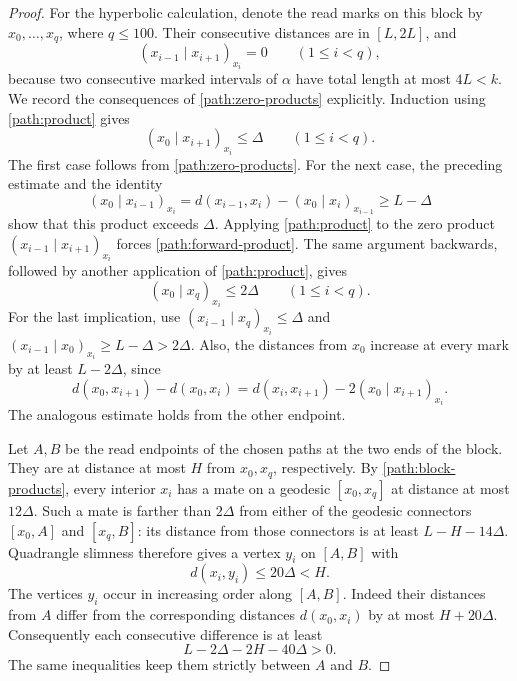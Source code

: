 \begin{proof}
For the hyperbolic calculation, denote the read marks on this block by
$x_0,\ldots,x_q$, where $q\le100$.  Their consecutive distances are in
$[L,2L]$, and
\begin{equation}\label{path:zero-products}
 (x_{i-1}\mid x_{i+1})_{x_i}=0\qquad(1\le i<q),
\end{equation}
because two consecutive marked intervals of $\alpha$ have total length
at most $4L<k$.  We record the consequences of
\eqref{path:zero-products} explicitly.  Induction using
\eqref{path:product} gives
\begin{equation}\label{path:forward-product}
 (x_0\mid x_{i+1})_{x_i}\le\Delta\qquad(1\le i<q).
\end{equation}
The first case follows from \eqref{path:zero-products}.  For the next
case, the preceding estimate and the identity
\[
 (x_0\mid x_{i-1})_{x_i}
 =d(x_{i-1},x_i)-(x_0\mid x_i)_{x_{i-1}}
 \ge L-\Delta
\]
show that this product exceeds $\Delta$.  Applying
\eqref{path:product} to the zero product
$(x_{i-1}\mid x_{i+1})_{x_i}$ forces
\eqref{path:forward-product}.  The same argument backwards, followed
by another application of \eqref{path:product}, gives
\begin{equation}\label{path:block-products}
 (x_0\mid x_q)_{x_i}\le2\Delta\qquad(1\le i<q).
\end{equation}
For the last implication, use
$(x_{i-1}\mid x_q)_{x_i}\le\Delta$ and
$(x_{i-1}\mid x_0)_{x_i}\ge L-\Delta>2\Delta$.
Also, the distances from $x_0$ increase at every mark by at least
$L-2\Delta$, since
\[
 d(x_0,x_{i+1})-d(x_0,x_i)
 =d(x_i,x_{i+1})-2(x_0\mid x_{i+1})_{x_i}.
\]
The analogous estimate holds from the other endpoint.

Let $A,B$ be the read endpoints of the chosen paths at the two ends of
the block.  They are at distance at most $H$ from $x_0,x_q$,
respectively.  By \eqref{path:block-products}, every interior $x_i$
has a mate on a geodesic $[x_0,x_q]$ at distance at most $12\Delta$.
Such a mate is farther than $2\Delta$ from either of the geodesic
connectors $[x_0,A]$ and $[x_q,B]$: its distance from those connectors
is at least $L-H-14\Delta$.  Quadrangle slimness therefore gives a
vertex $y_i$ on $[A,B]$ with
\begin{equation}\label{path:block-mates}
 d(x_i,y_i)\le20\Delta<H.
\end{equation}
The vertices $y_i$ occur in increasing order along $[A,B]$.  Indeed
their distances from $A$ differ from the corresponding distances
$d(x_0,x_i)$ by at most $H+20\Delta$.  Consequently each consecutive
difference is at least
\[
 L-2\Delta-2H-40\Delta>0.
\]
The same inequalities keep them strictly between $A$ and $B$.


\end{proof}
